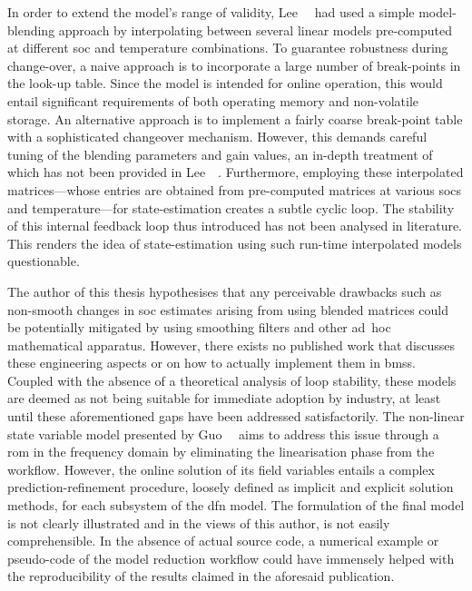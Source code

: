 In order to extend the model's range of validity, Lee~\etal{}~\cite{Lee2014} had
used a  simple model-blending approach  by interpolating between  several linear
models  pre-computed at  different  \gls{soc} and  temperature combinations.  To
guarantee robustness  during change-over, a  naive approach is to  incorporate a
large  number  of  break-points  in  the  look-up  table.  Since  the  model  is
intended  for  online  operation,  this would  entail  significant  requirements
of  both operating  memory  and non-volatile  storage.  An alternative  approach
is  to  implement  a  fairly  coarse  break-point  table  with  a  sophisticated
changeover  mechanism. However,  this  demands careful  tuning  of the  blending
parameters  and  gain values,  an  in-depth  treatment  of  which has  not  been
provided in Lee~\etal~\cite{Lee2014}.  Furthermore, employing these interpolated
matrices---whose  entries are  obtained  from pre-computed  matrices at  various
\glspl{soc} and temperature---for state-estimation creates a subtle cyclic loop.
The  stability of  this  internal feedback  loop thus  introduced  has not  been
analysed in  literature. This  renders the idea  of state-estimation  using such
run-time interpolated models questionable.


The author  of this thesis hypothesises  that any perceivable drawbacks  such as
non-smooth changes  in \gls{soc} estimates  arising from using  blended matrices
could  be potentially  mitigated by  using  smoothing filters  and other
\mbox{ad hoc} mathematical apparatus. However,  there exists no published  work
that discusses these engineering aspects  or on how to actually implement  them
in \glspl{bms}. Coupled with  the absence  of a  theoretical analysis  of loop
stability, these models are deemed  as not being suitable for immediate
adoption by industry, at least until  these aforementioned gaps  have been
addressed  satisfactorily. The non-linear state variable model  presented by
Guo~\etal{}~\cite{Guo2017} aims to address this  issue through a \gls{rom}  in
the frequency domain  by eliminating the linearisation phase  from the workflow.
However, the online  solution of its field  variables  entails  a complex
prediction-refinement  procedure,  loosely defined as  implicit and explicit
solution methods,  for each subsystem  of the \gls{dfn} model. The  formulation
of the final model is  not clearly illustrated and in the views of this author,
is not easily comprehensible. In the absence of actual source  code, a numerical
example  or pseudo-code of the  model reduction workflow could  have immensely
helped with the  reproducibility of  the results claimed in the aforesaid
publication.

